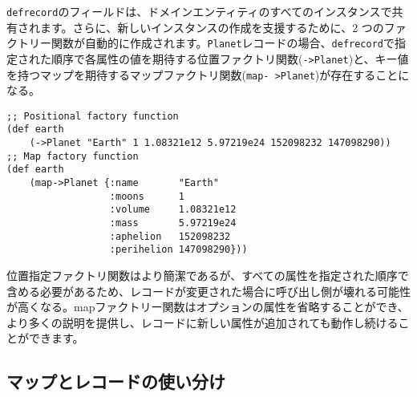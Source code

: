 \texttt{defrecord}のフィールドは、ドメインエンティティのすべてのインスタンスで共有されます。さらに、新しいインスタンスの作成を支援するために、2 つのファクトリー関数が自動的に作成されます。\texttt{Planet}レコードの場合、\texttt{defrecord}で指定された順序で各属性の値を期待する位置ファクトリ関数(\texttt{->Planet})と、キー値を持つマップを期待するマップファクトリ関数(\texttt{map- >Planet})が存在することになる。

\begin{lstlisting}[numbers=none]
;; Positional factory function
(def earth
    (->Planet "Earth" 1 1.08321e12 5.97219e24 152098232 147098290))
;; Map factory function
(def earth
    (map->Planet {:name       "Earth"
                  :moons      1
                  :volume     1.08321e12
                  :mass       5.97219e24
                  :aphelion   152098232
                  :perihelion 147098290}))
\end{lstlisting}

位置指定ファクトリ関数はより簡潔であるが、すべての属性を指定された順序で含める必要があるため、レコードが変更された場合に呼び出し側が壊れる可能性が高くなる。mapファクトリー関数はオプションの属性を省略することができ、より多くの説明を提供し、レコードに新しい属性が追加されても動作し続けることができます。

\subsection{マップとレコードの使い分け}

